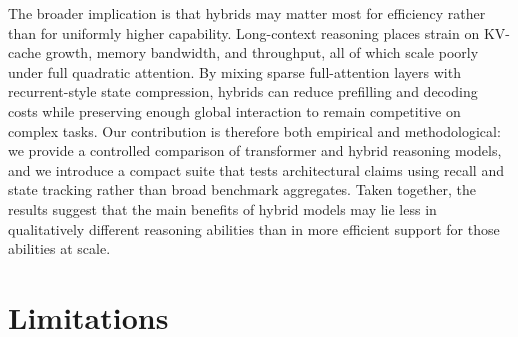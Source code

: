\documentclass[11pt]{article}
\theoremstyle{definition}
\begin{document}
The broader implication is that hybrids may matter most for efficiency rather than for uniformly higher capability. Long-context reasoning places strain on KV-cache growth, memory bandwidth, and throughput, all of which scale poorly under full quadratic attention. By mixing sparse full-attention layers with recurrent-style state compression, hybrids can reduce prefilling and decoding costs while preserving enough global interaction to remain competitive on complex tasks. Our contribution is therefore both empirical and methodological: we provide a controlled comparison of transformer and hybrid reasoning models, and we introduce a compact suite that tests architectural claims using recall and state tracking rather than broad benchmark aggregates. Taken together, the results suggest that the main benefits of hybrid models may lie less in qualitatively different reasoning abilities than in more efficient support for those abilities at scale.

\section{Limitations}
\label{sec:limitations}
\end{document}
